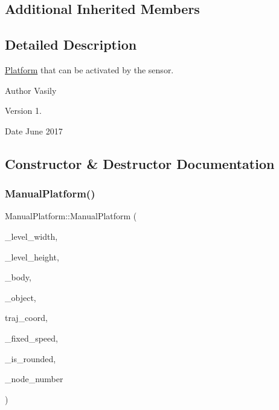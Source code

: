 \subsection*{Additional Inherited Members}


\subsection{Detailed Description}
\hyperlink{class_platform}{Platform} that can be activated by the sensor. 

\begin{DoxyAuthor}{Author}
Vasily 
\end{DoxyAuthor}
\begin{DoxyVersion}{Version}
1. 
\end{DoxyVersion}
\begin{DoxyDate}{Date}
June 2017 
\end{DoxyDate}


\subsection{Constructor \& Destructor Documentation}
\mbox{\label{class_manual_platform_a0192ef683b0f19b93bd238af98f8ce51}} 
\subsubsection{\texorpdfstring{Manual\+Platform()}{ManualPlatform()}}
{\footnotesize\ttfamily Manual\+Platform\+::\+Manual\+Platform (\begin{DoxyParamCaption}\item[{int}]{\+\_\+level\+\_\+width,  }\item[{int}]{\+\_\+level\+\_\+height,  }\item[{b2\+Body $\ast$}]{\+\_\+body,  }\item[{\hyperlink{class_object}{Object} $\ast$}]{\+\_\+object,  }\item[{std\+::vector$<$ std\+::pair$<$ double, double $>$$>$}]{traj\+\_\+coord,  }\item[{int}]{\+\_\+fixed\+\_\+speed,  }\item[{bool}]{\+\_\+is\+\_\+rounded,  }\item[{int}]{\+\_\+node\+\_\+number }\end{DoxyParamCaption})}



